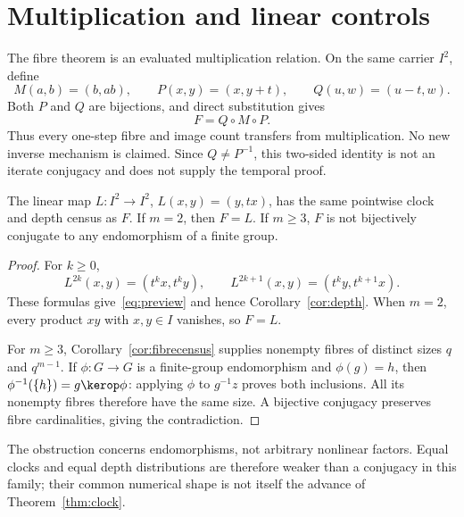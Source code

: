 \section{Multiplication and linear controls}
\label{sec:controls}

The fibre theorem is an evaluated multiplication relation. On the same
carrier $I^2$, define
\[
 M(a,b)=(b,ab),\qquad P(x,y)=(x,y+t),\qquad Q(u,w)=(u-t,w).
\]
Both $P$ and $Q$ are bijections, and direct substitution gives
\begin{equation}
 F=Q\circ M\circ P.
 \label{eq:adapter}
\end{equation}
Thus every one-step fibre and image count transfers from multiplication.
No new inverse mechanism is claimed. Since $Q\ne P^{-1}$, this two-sided
identity is not an iterate conjugacy and does not supply the temporal proof.

\begin{proposition}
\label{prop:linear}
The linear map $L:I^2\to I^2$, $L(x,y)=(y,tx)$, has the same pointwise
clock and depth census as $F$. If $m=2$, then $F=L$. If $m\geq3$, $F$
is not bijectively conjugate to any endomorphism of a finite group.
\end{proposition}

\begin{proof}
For $k\geq0$,
\[
 L^{2k}(x,y)=(t^kx,t^ky),\qquad
 L^{2k+1}(x,y)=(t^ky,t^{k+1}x).
\]
These formulas give~\eqref{eq:preview} and hence Corollary~\ref{cor:depth}.
When $m=2$, every product $xy$ with $x,y\in I$ vanishes, so $F=L$.

For $m\geq3$, Corollary~\ref{cor:fibrecensus} supplies nonempty fibres of
distinct sizes $q$ and $q^{m-1}$. If $\phi:G\to G$ is a finite-group
endomorphism and $\phi(g)=h$, then $\phi^{-1}(\{h\})=g\kerop\phi$:
applying $\phi$ to $g^{-1}z$ proves both inclusions. All its nonempty
fibres therefore have the same size. A bijective conjugacy preserves fibre
cardinalities, giving the contradiction.
\end{proof}

The obstruction concerns endomorphisms, not arbitrary nonlinear factors.
Equal clocks and equal depth distributions are therefore weaker than a
conjugacy in this family; their common numerical shape is not itself the
advance of Theorem~\ref{thm:clock}.
